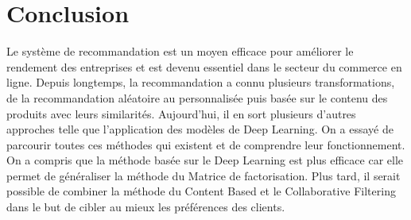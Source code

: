 \chapter*{Conclusion}

Le système de recommandation est un moyen efficace pour améliorer le rendement des entreprises et est devenu essentiel dans le secteur du commerce en ligne. Depuis longtemps, la recommandation a connu plusieurs transformations, de la recommandation aléatoire au personnalisée puis basée sur le contenu des produits avec leurs similarités. Aujourd’hui, il en sort plusieurs d’autres approches telle que l’application des modèles de Deep Learning. On a essayé de parcourir toutes ces méthodes qui existent et de comprendre leur fonctionnement. On a compris que la méthode basée sur le Deep Learning est plus efficace car elle permet de généraliser la méthode du Matrice de factorisation. Plus tard, il serait possible de combiner la méthode du Content Based et le Collaborative Filtering dans le but de cibler au mieux les préférences des clients.


